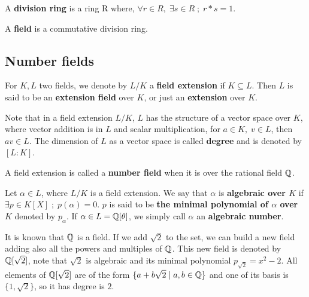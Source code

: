 \documentclass[a4paper,12pt]{article}
\begin{document}
\begin{definition}
  A \textbf{division ring} is a ring R where, $\forall r \in R, \; \exists s \in R \; ; \; r*s = 1$.
\end{definition}

\begin{definition}
  A \textbf{field} is a commutative division ring.
\end{definition}
\subsection{Number fields}
\label{sec:orgbe029eb}
 \begin{definition}
  For $K, L$ two fields, we denote by $L/K$ a \textbf{field extension} if  $K \subseteq L$. Then $L$ is said to be an \textbf{ extension field} over $K$, or just an \textbf{extension} over $K$.
\end{definition}

Note that in a field extension \(L/K\), \(L\) has the structure of a vector space over
\(K\), where vector addition is in \(L\) and scalar multiplication, for \(a \in K, \; v \in L\), then \(av \in L\). The dimension of \(L\) as a vector space is called
\textbf{degree} and is denoted by \([L:K]\).

\begin{definition}
  A field extension is called a  \textbf{number field} when it is over the rational field $\mathbb{Q}$. 
\end{definition}

\begin{definition}
  Let $\alpha \in L$, where $L/K$ is a field extension. We say that $\alpha$ is
  \textbf{algebraic over $K$} if $\exists p \in K[X] \;;\; p(\alpha) = 0$. $p$ is said to be
  \textbf{the minimal polynomial of $\alpha$ over $K$} denoted by $p_\alpha$. If $\alpha \in L =
  \mathbb{Q}[\theta]$, we simply call $\alpha$ an \textbf{algebraic number}.
\end{definition}

\begin{example}
  It is known that $\mathbb{Q}$ is a field. If we add $\sqrt{2}$ to the set, we
  can build a new field adding also all the powers and multiples of
  $\mathbb{Q}$. This new field is denoted by $\mathbb{Q}[\sqrt{2}]$, note that
  $\sqrt{2}$ is algebraic and its minimal polynomial $p_{\sqrt{2}} = x^2-2$. All
  elements of $\mathbb{Q}[\sqrt{2}]$ are of the form $\{a+b\sqrt{2} \;|\; a,b \in
  \mathbb{Q}\}$ and one of its basis is $\{1, \sqrt{2}\}$, so it has degree is
  $2$.
\end{example}
\end{document}
